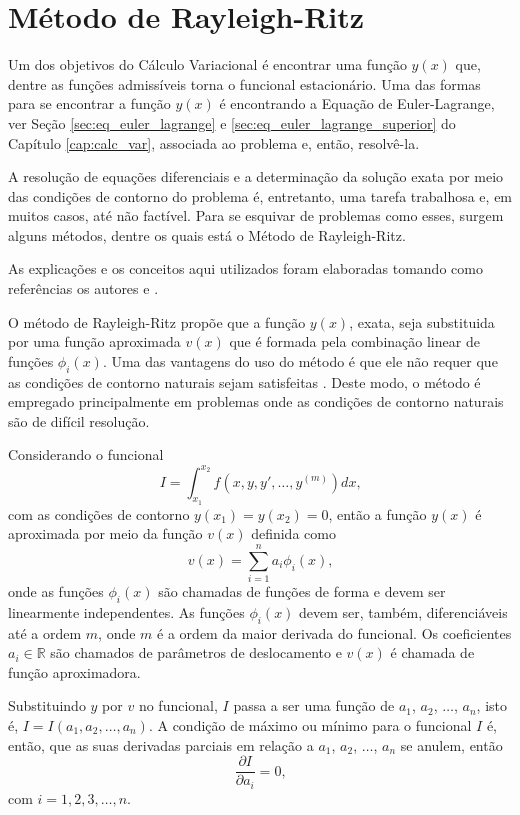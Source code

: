 \documentclass[
	12pt,				%
	openright,			%
    twoside,			%
	a4paper,			%
	english,			%
	french,				%
	spanish,			%
	brazil				%
	]{abntex2}
\numberwithin{lema}{chapter}
\numberwithin{teorema}{chapter}
\numberwithin{definicao}{chapter}
\numberwithin{exemplo}{chapter}
\numberwithin{figure}{chapter}
\begin{document}
\chapter{Método de Rayleigh-Ritz}
\label{cap:mrr}

Um dos objetivos do Cálculo Variacional é encontrar uma função $y(x)$ que, dentre as funções admissíveis torna o funcional estacionário. Uma das formas para se encontrar a função $y(x)$ é encontrando a Equação de Euler-Lagrange, ver Seção \ref{sec:eq_euler_lagrange} e \ref{sec:eq_euler_lagrange_superior} do Capítulo \ref{cap:calc_var}, associada ao problema e, então, resolvê-la. 

A resolução de equações diferenciais e a determinação da solução exata por meio das condições de contorno do problema é, entretanto,  uma tarefa trabalhosa e, em muitos casos, até não factível. Para se esquivar de problemas como esses, surgem alguns métodos, dentre os quais está o Método de Rayleigh-Ritz.

As explicações e os conceitos aqui utilizados foram elaboradas tomando como referências os autores  e .

O método de Rayleigh-Ritz propõe que a função $y(x)$, exata, seja substituida por uma função aproximada $v(x)$ que é formada pela combinação linear de funções $\phi _i(x)$. Uma das vantagens do uso do método é que ele não requer que as condições de contorno naturais sejam satisfeitas \cite{GROSSI_2001}. Deste modo, o método é empregado principalmente em problemas onde as condições de contorno naturais são de difícil resolução.

Considerando o funcional
$$
	I=\int_{x_1}^{x_2} f(x,y,y',\dots,y^{(m)})dx
	\text{,}
$$
com as condições de contorno $y(x_1)=y(x_2)=0$, então a função $y(x)$ é aproximada por meio da função $v(x)$ definida como
$$
	v(x) = \sum_{i=1}^n a_i \phi _i (x)
	\text{,}
$$
onde as funções $\phi_i(x)$ são chamadas de funções de forma e devem ser linearmente independentes. As funções $\phi_i(x)$ devem ser, também, diferenciáveis até a ordem $m$, onde $m$ é a ordem da maior derivada do funcional. Os coeficientes $a_i \in \mathbb{R}$ são chamados de parâmetros de deslocamento e $v(x)$ é chamada de função aproximadora.

Substituindo $y$ por $v$ no funcional, $I$ passa a ser uma função de $a_1$, $a_2$, $\dots$, $a_n$, isto é, $I=I(a_1, a_2, \dots, a_n)$. A condição de máximo ou mínimo para o funcional $I$ é, então, que as suas derivadas parciais em relação a $a_1$, $a_2$, $\dots$, $a_n$ se anulem, então
$$
	\frac{\partial I}{\partial a_i} = 0
	\text{,}
$$
com $i=1, 2, 3, \dots, n$.
\end{document}
